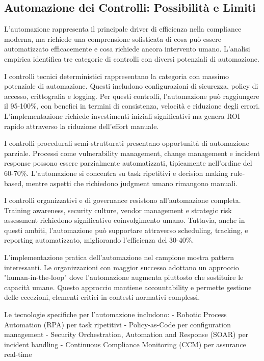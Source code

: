 \subsection{Automazione dei Controlli: Possibilità e Limiti}

L'automazione rappresenta il principale driver di efficienza nella compliance moderna, ma richiede una comprensione sofisticata di cosa può essere automatizzato efficacemente e cosa richiede ancora intervento umano. L'analisi empirica identifica tre categorie di controlli con diversi potenziali di automazione.

I controlli tecnici deterministici rappresentano la categoria con massimo potenziale di automazione. Questi includono configurazioni di sicurezza, policy di accesso, crittografia e logging. Per questi controlli, l'automazione può raggiungere il 95-100\%, con benefici in termini di consistenza, velocità e riduzione degli errori. L'implementazione richiede investimenti iniziali significativi ma genera ROI rapido attraverso la riduzione dell'effort manuale.

I controlli procedurali semi-strutturati presentano opportunità di automazione parziale. Processi come vulnerability management, change management e incident response possono essere parzialmente automatizzati, tipicamente nell'ordine del 60-70\%. L'automazione si concentra su task ripetitivi e decision making rule-based, mentre aspetti che richiedono judgment umano rimangono manuali.

I controlli organizzativi e di governance resistono all'automazione completa. Training awareness, security culture, vendor management e strategic risk assessment richiedono significativo coinvolgimento umano. Tuttavia, anche in questi ambiti, l'automazione può supportare attraverso scheduling, tracking, e reporting automatizzato, migliorando l'efficienza del 30-40\%.

L'implementazione pratica dell'automazione nel campione mostra pattern interessanti. Le organizzazioni con maggior successo adottano un approccio "human-in-the-loop" dove l'automazione augmenta piuttosto che sostituire le capacità umane. Questo approccio mantiene accountability e permette gestione delle eccezioni, elementi critici in contesti normativi complessi.

Le tecnologie specifiche per l'automazione includono:
- Robotic Process Automation (RPA) per task ripetitivi
- Policy-as-Code per configuration management
- Security Orchestration, Automation and Response (SOAR) per incident handling
- Continuous Compliance Monitoring (CCM) per assurance real-time

